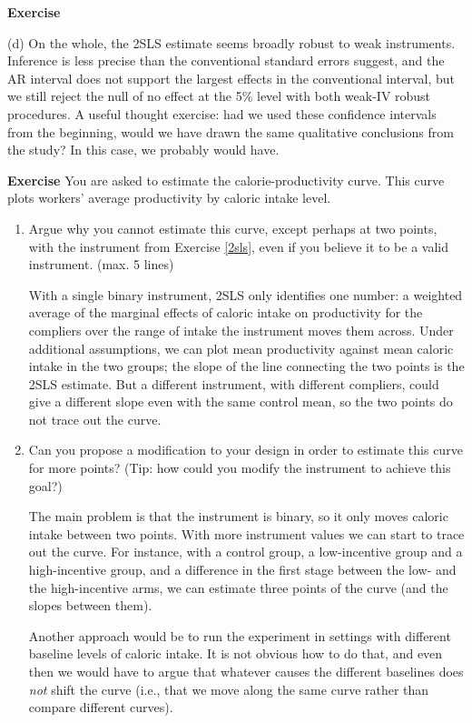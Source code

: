 \documentclass[10pt]{article}
\newcounter{exercise}
\newenvironment{exercise}%
{%
	\refstepcounter{exercise}%
	\textbf{Exercise \theexercise}%
	}%
{
 \par\vspace{\baselineskip}%
\noindent\ignorespacesafterend
}
\begin{document}
\begin{exercise}
\begin{enumerate}
		(d) On the whole, the 2SLS estimate seems broadly robust to weak instruments. Inference is less precise than the conventional standard errors suggest, and the AR interval does not support the largest effects in the conventional interval, but we still reject the null of no effect at the 5\% level with both weak-IV robust procedures. A useful thought exercise: had we used these confidence intervals from the beginning, would we have drawn the same qualitative conclusions from the study? In this case, we probably would have.

		
		\color{black}
	\end{enumerate}
\end{exercise}


\begin{exercise}\label{ext_val}
	You are asked to estimate the calorie-productivity curve. This curve plots workers' average productivity by caloric intake level.
	\begin{enumerate}
		\item Argue why you cannot estimate this curve, except perhaps at two points, with the instrument from Exercise \ref{2sls}, even if you believe it to be a valid instrument. (max. 5 lines)

		\color{red}
		With a single binary instrument, 2SLS only identifies one number: a weighted average of the marginal effects of caloric intake on productivity for the compliers over the range of intake the instrument moves them across. Under additional assumptions, we can plot mean productivity against mean caloric intake in the two groups; the slope of the line connecting the two points is the 2SLS estimate. But a different instrument, with different compliers, could give a different slope even with the same control mean, so the two points do not trace out the curve.
		\color{black}
		\item Can you propose a modification to your design in order to estimate this curve for more points? (Tip: how could you modify the instrument to achieve this goal?)

		\color{red}
		The main problem is that the instrument is binary, so it only moves caloric intake between two points. With more instrument values we can start to trace out the curve. For instance, with a control group, a low-incentive group and a high-incentive group, and a difference in the first stage between the low- and the high-incentive arms, we can estimate three points of the curve (and the slopes between them).

		Another approach would be to run the experiment in settings with different baseline levels of caloric intake. It is not obvious how to do that, and even then we would have to argue that whatever causes the different baselines does \textit{not} shift the curve (i.e., that we move along the same curve rather than compare different curves).
		\color{black}
	\end{enumerate}
\end{exercise}




\end{document}
